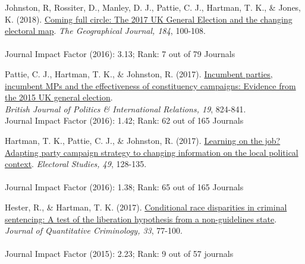 \documentclass[12pt]{article}
\begin{document}
\begin{bibenum}
	\item Johnston, R, Rossiter, D., Manley, D. J., Pattie, C. J., 
		  {Hartman, T. K.}, \& Jones, K. (2018).
		  \href{https://onlinelibrary.wiley.com/doi/full/10.1111/geoj.12240}
		  {Coming full circle: 
		  The 2017 UK General Election and the changing electoral map}. 
		  \emph{The Geographical Journal, 184}, 100-108.\\
          \\
          Journal Impact Factor (2016): 3.13; Rank: 7 out of 79 Journals
          
    \item Pattie, C. J., {Hartman, T. K.}, \& Johnston, R. (2017).
          \href{http://tkhartman.staff.shef.ac.uk/_content/documents/Pattie.Hartman.Johnston2017.British.Journal.of.Politics.and.International.Relations.pdf}
          {Incumbent parties, incumbent MPs and the effectiveness of 
          constituency campaigns: Evidence from the 2015 UK general election}. \\
          \emph{British Journal of Politics \& International Relations, 19}, 824-841.\\
          Journal Impact Factor (2016): 1.42; Rank: 62 out of 165 Journals
          
    \item {Hartman, T. K.}, Pattie, C. J., \& Johnston, R. (2017).
    	  \href{http://tkhartman.staff.shef.ac.uk/_content/documents/Hartman.Pattie.Johnston.2017.Electoral.Studies.pdf}
          {Learning on the job? Adapting party campaign strategy 
          to changing information on the local political context}. 
          \emph{Electoral Studies, 49}, 128-135.\\
          \\
          Journal Impact Factor (2016): 1.38; Rank: 65 out of 165 Journals
          
    \item Hester, R., \& {Hartman, T. K.} (2017). 
          \href{http://tkhartman.staff.shef.ac.uk/_content/documents/Hester.Hartman2016.Journal.of.Quantitative.Criminology.pdf}
          {Conditional race disparities in criminal sentencing: 
          A test of the liberation hypothesis from a non-guidelines state}. 
          \emph{Journal of Quantitative Criminology, 33}, 77-100.\\
          \\
          Journal Impact Factor (2015): 2.23; Rank: 9 out of 57 journals
          

\end{bibenum}
\end{document}
